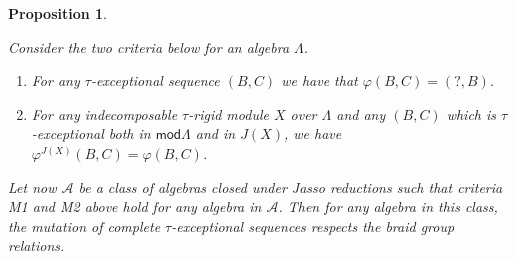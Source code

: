 \documentclass[11pt]{amsart}
\newcommand{\mods}{\mathsf{mod}}
\newtheorem{proposition}[theorem]{Proposition}
\theoremstyle{definition}
\begin{document}
\begin{proposition}\label{prop:properties_mutation_braid_group}

    Consider the two criteria below for an algebra $\Lambda$.

    \begin{enumerate}
        \item[M1:] For any $\tau$-exceptional sequence $(B,C)$ we have that $\varphi(B,C) = (?,B)$.
        \item[M2:] For any indecomposable $\tau$-rigid module $X$ over $\Lambda$ and any $(B,C)$ which is $\tau$-exceptional both in $\mods \Lambda$ and in $J(X)$, we have $\varphi^{J(X)}(B,C) = \varphi(B,C)$.
    \end{enumerate}

    Let now $\mathcal{A}$ be a class of algebras closed under Jasso reductions such that criteria M1 and M2 above hold for any algebra in $\mathcal{A}$. Then for any algebra in this class, the mutation of complete $\tau$-exceptional sequences respects the braid group relations.
\end{proposition}
\end{document}

